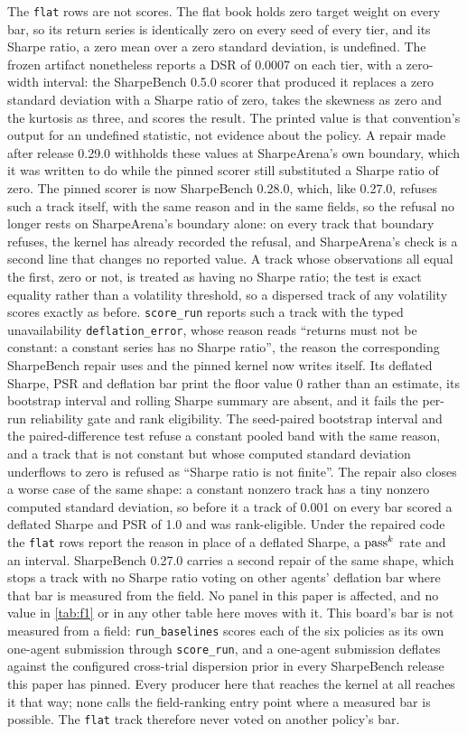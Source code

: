The \texttt{flat} rows are not scores. The flat book holds zero target weight on every bar, so its return series is identically zero on every seed of every tier, and its Sharpe ratio, a zero mean over a zero standard deviation, is undefined. The frozen artifact nonetheless reports a DSR of 0.0007 on each tier, with a zero-width interval: the SharpeBench 0.5.0 scorer that produced it replaces a zero standard deviation with a Sharpe ratio of zero, takes the skewness as zero and the kurtosis as three, and scores the result. The printed value is that convention's output for an undefined statistic, not evidence about the policy. A repair made after release 0.29.0 withholds these values at SharpeArena's own boundary, which it was written to do while the pinned scorer still substituted a Sharpe ratio of zero. The pinned scorer is now SharpeBench 0.28.0, which, like 0.27.0, refuses such a track itself, with the same reason and in the same fields, so the refusal no longer rests on SharpeArena's boundary alone: on every track that boundary refuses, the kernel has already recorded the refusal, and SharpeArena's check is a second line that changes no reported value. A track whose observations all equal the first, zero or not, is treated as having no Sharpe ratio; the test is exact equality rather than a volatility threshold, so a dispersed track of any volatility scores exactly as before. \texttt{score\_run} reports such a track with the typed unavailability \texttt{deflation\_error}, whose reason reads ``returns must not be constant: a constant series has no Sharpe ratio'', the reason the corresponding SharpeBench repair uses and the pinned kernel now writes itself. Its deflated Sharpe, PSR and deflation bar print the floor value 0 rather than an estimate, its bootstrap interval and rolling Sharpe summary are absent, and it fails the per-run reliability gate and rank eligibility. The seed-paired bootstrap interval and the paired-difference test refuse a constant pooled band with the same reason, and a track that is not constant but whose computed standard deviation underflows to zero is refused as ``Sharpe ratio is not finite''. The repair also closes a worse case of the same shape: a constant nonzero track has a tiny nonzero computed standard deviation, so before it a track of 0.001 on every bar scored a deflated Sharpe and PSR of 1.0 and was rank-eligible. Under the repaired code the \texttt{flat} rows report the reason in place of a deflated Sharpe, a $\text{pass}^{k}$ rate and an interval. SharpeBench 0.27.0 carries a second repair of the same shape, which stops a track with no Sharpe ratio voting on other agents' deflation bar where that bar is measured from the field. No panel in this paper is affected, and no value in \cref{tab:f1} or in any other table here moves with it. This board's bar is not measured from a field: \texttt{run\_baselines} scores each of the six policies as its own one-agent submission through \texttt{score\_run}, and a one-agent submission deflates against the configured cross-trial dispersion prior in every SharpeBench release this paper has pinned. Every producer here that reaches the kernel at all reaches it that way; none calls the field-ranking entry point where a measured bar is possible. The \texttt{flat} track therefore never voted on another policy's bar. 